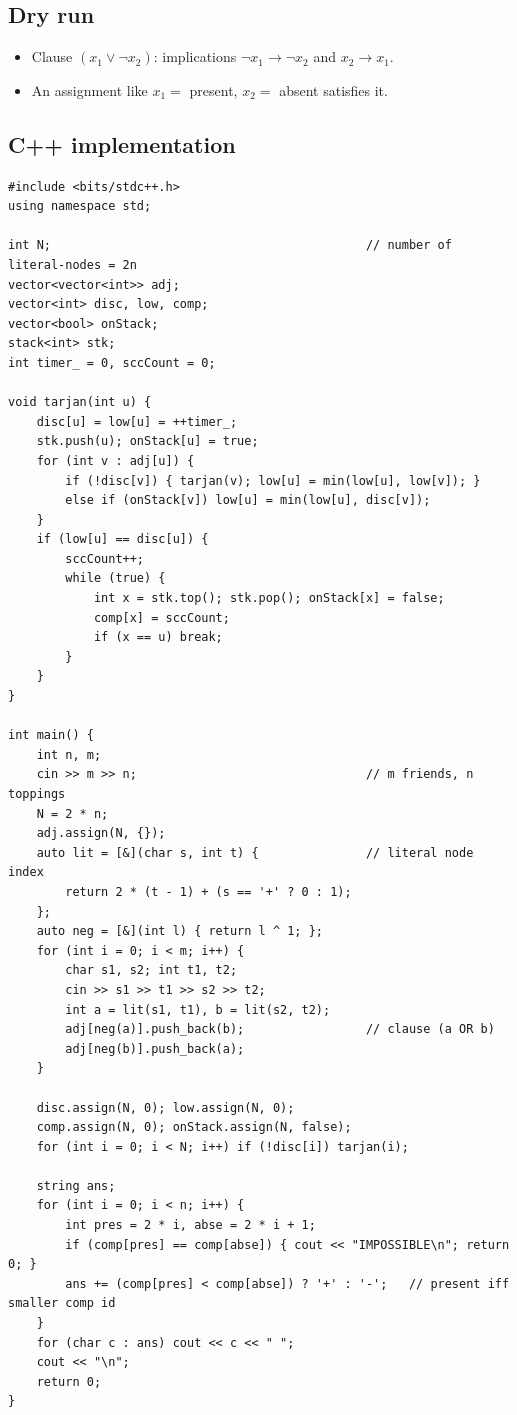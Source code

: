 \subsection*{Dry run}


\begin{itemize}
  \item Clause $(x_1\lor\lnot x_2)$: implications $\lnot x_1\to\lnot x_2$
        and $x_2\to x_1$.
  \item An assignment like $x_1=$ present, $x_2=$ absent satisfies it.
\end{itemize}

\subsection*{C++ implementation}

\begin{lstlisting}
#include <bits/stdc++.h>
using namespace std;

int N;                                            // number of literal-nodes = 2n
vector<vector<int>> adj;
vector<int> disc, low, comp;
vector<bool> onStack;
stack<int> stk;
int timer_ = 0, sccCount = 0;

void tarjan(int u) {
    disc[u] = low[u] = ++timer_;
    stk.push(u); onStack[u] = true;
    for (int v : adj[u]) {
        if (!disc[v]) { tarjan(v); low[u] = min(low[u], low[v]); }
        else if (onStack[v]) low[u] = min(low[u], disc[v]);
    }
    if (low[u] == disc[u]) {
        sccCount++;
        while (true) {
            int x = stk.top(); stk.pop(); onStack[x] = false;
            comp[x] = sccCount;
            if (x == u) break;
        }
    }
}

int main() {
    int n, m;
    cin >> m >> n;                                // m friends, n toppings
    N = 2 * n;
    adj.assign(N, {});
    auto lit = [&](char s, int t) {               // literal node index
        return 2 * (t - 1) + (s == '+' ? 0 : 1);
    };
    auto neg = [&](int l) { return l ^ 1; };
    for (int i = 0; i < m; i++) {
        char s1, s2; int t1, t2;
        cin >> s1 >> t1 >> s2 >> t2;
        int a = lit(s1, t1), b = lit(s2, t2);
        adj[neg(a)].push_back(b);                 // clause (a OR b)
        adj[neg(b)].push_back(a);
    }

    disc.assign(N, 0); low.assign(N, 0);
    comp.assign(N, 0); onStack.assign(N, false);
    for (int i = 0; i < N; i++) if (!disc[i]) tarjan(i);

    string ans;
    for (int i = 0; i < n; i++) {
        int pres = 2 * i, abse = 2 * i + 1;
        if (comp[pres] == comp[abse]) { cout << "IMPOSSIBLE\n"; return 0; }
        ans += (comp[pres] < comp[abse]) ? '+' : '-';   // present iff smaller comp id
    }
    for (char c : ans) cout << c << " ";
    cout << "\n";
    return 0;
}
\end{lstlisting}

